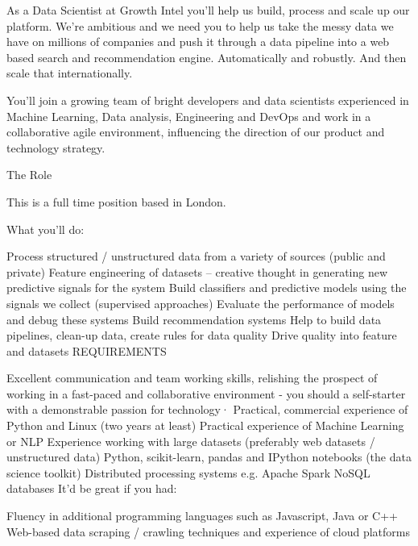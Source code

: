 As a Data Scientist at Growth Intel you'll help us build, process and scale up our platform. We're
ambitious and we need you to help us take the messy data we have on millions of companies and push
it through a data pipeline into a web based search and recommendation engine. Automatically and
robustly. And then scale that internationally.

You'll join a growing team of bright developers and data scientists experienced in Machine
Learning, Data analysis, Engineering and DevOps and work in a collaborative agile environment,
influencing the direction of our product and technology strategy.

The Role

This is a full time position based in London.

What you’ll do:

Process structured / unstructured data from a variety of sources (public and private)
Feature engineering of datasets – creative thought in generating new predictive signals for the
system
Build classifiers and predictive models using the signals we collect (supervised approaches)
Evaluate the performance of models and debug these systems
Build recommendation systems
Help to build data pipelines, clean-up data, create rules for data quality
Drive quality into feature and datasets
REQUIREMENTS

Excellent communication and team working skills, relishing the prospect of working in a fast-paced
and collaborative environment - you should a self-starter with a demonstrable passion for
technology·
Practical, commercial experience of Python and Linux (two years at least)
Practical experience of Machine Learning or NLP
Experience working with large datasets (preferably web datasets / unstructured data)
Python, scikit-learn, pandas and IPython notebooks (the data science toolkit)
Distributed processing systems e.g. Apache Spark
NoSQL databases
It'd be great if you had:

Fluency in additional programming languages such as Javascript, Java or C++
Web-based data scraping / crawling techniques and experience of cloud platforms
